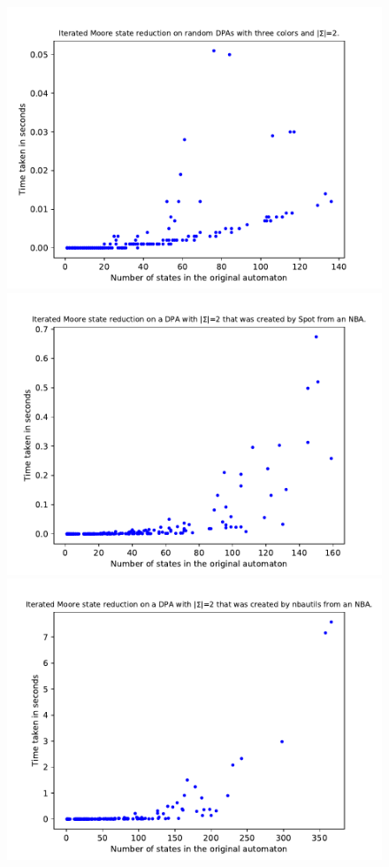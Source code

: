 \begin{figure}
	\centering
	\begin{minipage}{0.49\textwidth}
		\includegraphics[page=6,height=.3\textheight]{../data/analysis/iterated_moore/gendet_ap1.pdf} 
		\includegraphics[page=6,height=.3\textheight]{../data/analysis/iterated_moore/detspot_ap1.pdf} 
		\includegraphics[page=6,height=.3\textheight]{../data/analysis/iterated_moore/detnbaut_ap1.pdf} 

\end{minipage}
\end{figure}
